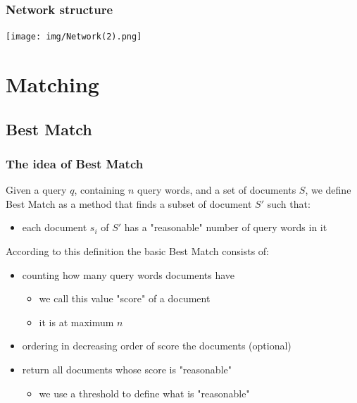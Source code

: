 \documentclass{beamer}
\begin{document}
\begin{frame}
\frametitle{Network structure}
\begin{center}
\texttt{[image: img/Network(2).png]} 
\end{center}
\end{frame}

\section{Matching}
\subsection{Best Match}
\begin{frame}
\frametitle{The idea of Best Match}
Given a query $q$, containing $n$ query words, and a set of documents $S$, we define Best Match as a method that finds a subset of document $S'$ such that:
\begin{itemize}
	\item each document $s_i$ of $S'$ has a "reasonable" number of query words in it
\end{itemize}
\medskip
According to this definition the basic Best Match consists of:
\begin{itemize}
	\item counting how many query words documents have
	\begin{itemize}
		\item we call this value "score" of a document
		\item it is at maximum $n$
	\end{itemize}
	\item ordering in decreasing order of score the documents (optional)
	\item return all documents whose score is "reasonable"
	\begin{itemize}
		\item we use a threshold to define what is "reasonable"
	\end{itemize}
\end{itemize}
\end{frame}
\end{document}
